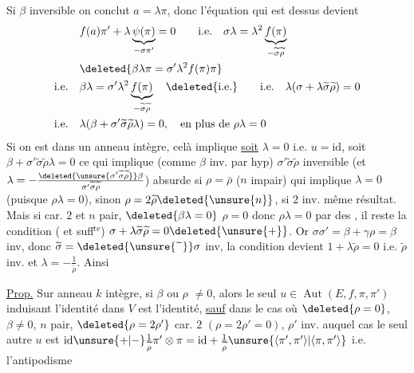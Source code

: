 Si $\beta$ inversible on conclut $a=\lambda\pi$, donc l'équation qui est dessus  devient
\[
\begin{aligned}
& f(a)\pi'+\lambda\underbrace{\psi(\pi)}_{-\sigma\pi'}=0\qquad\text{i.e.}\quad \sigma\lambda=\lambda^2\underbrace{f(\pi)}_{-\widetilde\sigma\widetilde\rho}\\
&\deleted{\beta\lambda\pi=\sigma'\lambda^2 f(\pi)\pi}\\
\text{i.e.}\quad &\beta\lambda=\sigma'\lambda^2\underbrace{f(\pi)}_{-\widetilde\sigma\widetilde\rho}\quad\deleted{\text{i.e.}}\qquad\text{i.e.}\quad\lambda(\sigma+\lambda\widetilde\sigma\widetilde\rho)=0\\
\text{i.e.}\quad &\lambda(\beta+\sigma'\widetilde\sigma\widetilde\rho\lambda)=0,\quad\text{en plus de }\rho\lambda=0
\end{aligned}
\]
Si on est dans un anneau intègre, celà implique \uline{soit} $\lambda=0$ i.e. $u=\mathrm{id}$, soit $\beta+\sigma'\widetilde\sigma\widetilde\rho\lambda=0$ ce qui implique (comme $\beta$ inv. par hyp) $\sigma'\widetilde\sigma\widetilde\rho$ inversible (et $\lambda=-\frac{\deleted{\unsure{\sigma'\widetilde\sigma\widetilde\rho}}\beta}{\sigma'\widetilde\sigma\widetilde\rho}$) absurde si $\rho=\bar\rho$ ($n$ impair) qui implique $\lambda=0$ (puisque $\rho\lambda=0$), sinon $\rho=2\widetilde\rho\deleted{\unsure{n}}$, si $2$ inv.  même résultat. Mais si car. $2$ et $n$ pair, $\deleted{\beta\lambda=0}$ $\rho=0$ donc $\rho\lambda=0$ par des , il reste la condition ( et suff$^{\mathrm{te}}$) $\sigma+\lambda\widetilde\sigma\widetilde\rho=0\deleted{\unsure{+}}$. Or $\sigma\sigma'=\beta+\gamma\rho=\beta$  inv, donc  $\widetilde\sigma=\deleted{\unsure{\widetilde{\phantom\sigma}}}\sigma$  inv, la condition devient $1+\lambda\widetilde\rho=0$ i.e. $\widetilde\rho$ inv. et $\lambda=-\frac1{\widetilde\rho}$. Ainsi

\uline{Prop.} Sur anneau $k$ intègre, si $\beta$ ou $\rho$ $\ne0$, alors le seul $u\in\operatorname{Aut}(E,f,\pi,\pi')$ induisant l'identité dans $V$ est l'identité, \uline{sauf} dans le cas où $\deleted{\rho=0}$, $\beta\ne0$, $n$ pair, $\deleted{\rho=2\rho'}$ car. $2$ $(\rho=2\rho'=0)$, $\rho'$ inv. auquel cas le seul autre $u$ est $\mathrm{id}\unsure{+|-}\frac1{\widetilde\rho}\pi'\otimes\pi=\mathrm{id}+\frac1{\widetilde\rho}\unsure{\langle\pi',\pi'\rangle|\langle\pi,\pi'\rangle}$ i.e. l'antipodisme

